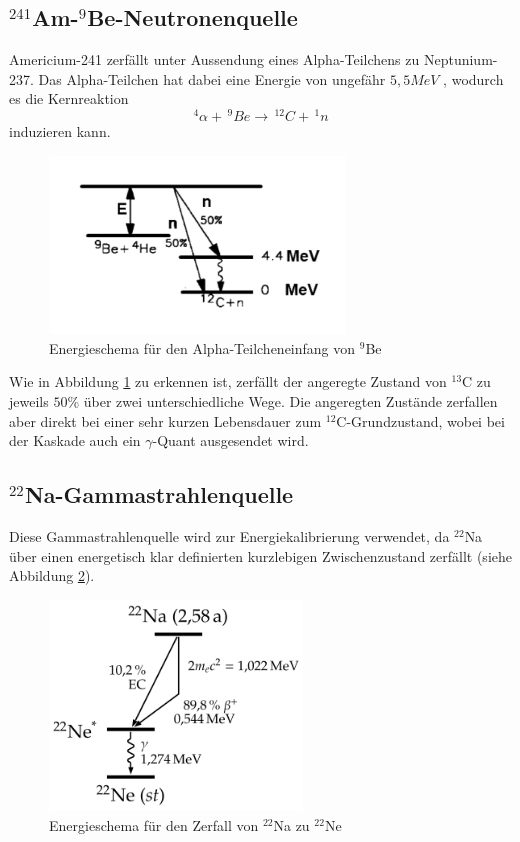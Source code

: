 \subsection{$^{241}$Am-$^9$Be-Neutronenquelle}
Americium-241 zerfällt unter Aussendung eines Alpha-Teilchens zu Neptunium-237. Das Alpha-Teilchen hat dabei eine Energie von ungefähr $5,5MeV$ \cite{americium}, wodurch es die Kernreaktion
\begin{equation}
 ^4\alpha + \,^9Be \rightarrow\, ^{12}C +\, ^1n
\end{equation}
induzieren kann.

\begin{figure}[htbp]  
     \includegraphics[width=0.7\textwidth]{beryllium.png}
  \caption{Energieschema für den Alpha-Teilcheneinfang von $^9$Be \cite{anleitung}}
  \label{beryllium}
\end{figure}

Wie in Abbildung \ref{beryllium} zu erkennen ist, zerfällt der
angeregte Zustand von $^13$C zu jeweils $50\%$ über zwei unterschiedliche Wege. Die angeregten Zustände zerfallen aber direkt bei einer sehr kurzen Lebensdauer zum $^{12}$C-Grundzustand, wobei bei der Kaskade auch ein $\gamma$-Quant ausgesendet wird.

\subsection{$^{22}$Na-Gammastrahlenquelle}
Diese Gammastrahlenquelle wird zur Energiekalibrierung verwendet, da $^{22}$Na über einen energetisch klar definierten kurzlebigen Zwischenzustand zerfällt (siehe Abbildung \ref{na22}).

\begin{figure}[htbp]  
     \includegraphics[width=0.6\textwidth]{Na22.png}
  \caption{Energieschema für den Zerfall von $^{22}$Na zu $^{22}$Ne \cite{na22}}
  \label{na22}
\end{figure}

